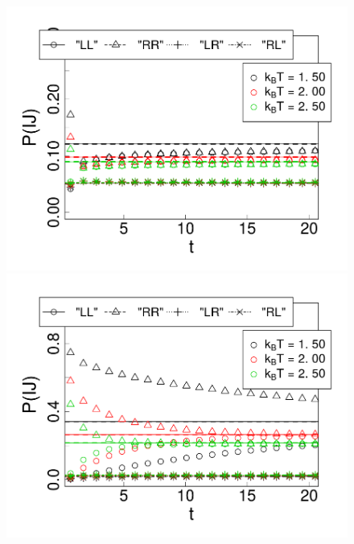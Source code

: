 \begin{figure}[t]
\centering
\begin{minipage}[c]{0.8\columnwidth}
	\includegraphics[width=\textwidth]{Images/Particle_probs_25}
\end{minipage}
\begin{minipage}[c]{0.8\columnwidth}
	\includegraphics[width=\textwidth]{Images/Particle_probs_75}
\end{minipage}


\end{figure}
